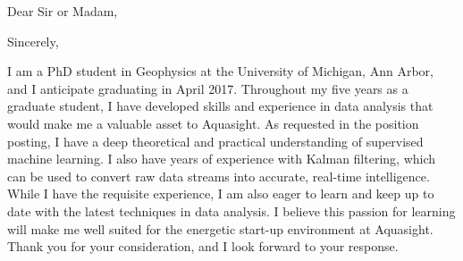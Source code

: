 \documentclass[11pt,a4paper,sans]{moderncv}
\begin{document}
\date{November 28, 2016}
\opening{Dear Sir or Madam,}
\closing{Sincerely,}
\makelettertitle

I am a PhD student in Geophysics at the University of Michigan, Ann Arbor, and I anticipate graduating in April 2017.  Throughout my five years as a graduate student, I have developed skills and experience in data analysis that would make me a valuable asset to Aquasight. As requested in the position posting, I have a deep theoretical and practical understanding of supervised machine learning. I also have years of experience with Kalman filtering, which can be used to convert raw data streams into accurate, real-time intelligence.  While I have the requisite experience, I am also eager to learn and keep up to date with the latest techniques in data analysis. I believe this passion for learning will make me well suited for the energetic start-up environment at Aquasight. Thank you for your consideration, and I look forward to your response.

\makeletterclosing
\end{document}
